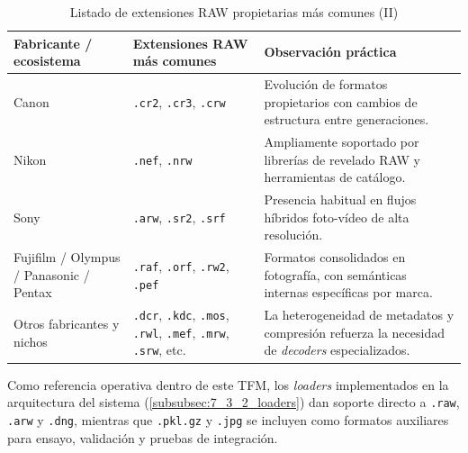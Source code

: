 \begin{table}[htbp]
    \centering
    \footnotesize
    \renewcommand{\arraystretch}{1.15}
    \setlength{\tabcolsep}{4pt}
    \begin{tabularx}{\textwidth}{|>{\hsize=0.75\hsize\raggedright\arraybackslash}X|>{\hsize=1.35\hsize\raggedright\arraybackslash}X|>{\hsize=0.90\hsize\raggedright\arraybackslash}X|}
        \hline
        \rowcolor[gray]{0.90}
        \textbf{Fabricante / ecosistema} & \textbf{Extensiones RAW más comunes} & \textbf{Observación práctica} \\
        \hline
        Canon & \texttt{.cr2}, \texttt{.cr3}, \texttt{.crw} & Evolución de formatos propietarios con cambios de estructura entre generaciones. \\
        \hline
        Nikon & \texttt{.nef}, \texttt{.nrw} & Ampliamente soportado por librerías de revelado RAW y herramientas de catálogo. \\
        \hline
        Sony & \texttt{.arw}, \texttt{.sr2}, \texttt{.srf} & Presencia habitual en flujos híbridos foto-vídeo de alta resolución. \\
        \hline
        Fujifilm / Olympus / Panasonic / Pentax & \texttt{.raf}, \texttt{.orf}, \texttt{.rw2}, \texttt{.pef} & Formatos consolidados en fotografía, con semánticas internas específicas por marca. \\
        \hline
        Otros fabricantes y nichos & \texttt{.dcr}, \texttt{.kdc}, \texttt{.mos}, \texttt{.rwl}, \texttt{.mef}, \texttt{.mrw}, \texttt{.srw}, etc. & La heterogeneidad de metadatos y compresión refuerza la necesidad de \textit{decoders} especializados. \\
        \hline
    \end{tabularx}
    \caption{Listado de extensiones RAW propietarias más comunes (II)}
    \label{tab:appendix_d_raw_formats_common_ii}
\end{table}

Como referencia operativa dentro de este TFM, los \textit{loaders}
implementados en la arquitectura del sistema (\autoref{subsubsec:7_3_2_loaders}) dan soporte directo a
\texttt{.raw}, \texttt{.arw} y \texttt{.dng}, mientras que
\texttt{.pkl.gz} y \texttt{.jpg} se incluyen como formatos auxiliares para
ensayo, validación y pruebas de integración.
